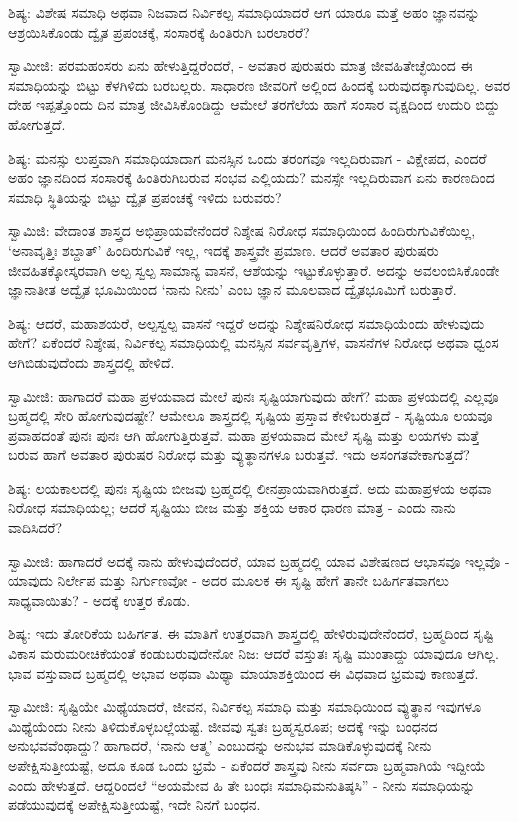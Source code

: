 ಶಿಷ್ಯ: ವಿಶೇಷ ಸಮಾಧಿ ಅಥವಾ ನಿಜವಾದ ನಿರ್ವಿಕಲ್ಪ ಸಮಾಧಿಯಾದರೆ ಆಗ ಯಾರೂ ಮತ್ತೆ ಅಹಂ ಜ್ಞಾನವನ್ನು ಆಶ್ರಯಿಸಿಕೊಂಡು ದ್ವೈತ ಪ್ರಪಂಚಕ್ಕೆ, ಸಂಸಾರಕ್ಕೆ ಹಿಂತಿರುಗಿ ಬರಲಾರರೆ?

ಸ್ವಾಮೀಜಿ: ಪರಮಹಂಸರು ಏನು ಹೇಳುತ್ತಿದ್ದರೆಂದರೆ, - ಅವತಾರ ಪುರುಷರು ಮಾತ್ರ ಜೀವಹಿತೇಚ್ಛೆಯಿಂದ ಈ ಸಮಾಧಿಯನ್ನು ಬಿಟ್ಟು ಕೆಳಗಿಳಿದು ಬರಬಲ್ಲರು. ಸಾಧಾರಣ ಜೀವರಿಗೆ ಅಲ್ಲಿಂದ ಹಿಂದಕ್ಕೆ ಬರುವುದಕ್ಕಾಗುವುದಿಲ್ಲ. ಅವರ ದೇಹ ಇಪ್ಪತ್ತೊಂದು ದಿನ ಮಾತ್ರ ಜೀವಿಸಿಕೊಂಡಿದ್ದು ಆಮೇಲೆ ತರಗೆಲೆಯ ಹಾಗೆ ಸಂಸಾರ ವೃಕ್ಷದಿಂದ ಉದುರಿ ಬಿದ್ದು ಹೋಗುತ್ತದೆ.

ಶಿಷ್ಯ: ಮನಸ್ಸು ಲುಪ್ತವಾಗಿ ಸಮಾಧಿಯಾದಾಗ ಮನಸ್ಸಿನ ಒಂದು ತರಂಗವೂ ಇಲ್ಲದಿರುವಾಗ - ವಿಕ್ಷೇಪದ, ಎಂದರೆ ಅಹಂ ಜ್ಞಾನದಿಂದ ಸಂಸಾರಕ್ಕೆ ಹಿಂತಿರುಗಿಬರುವ ಸಂಭವ ಎಲ್ಲಿಯದು? ಮನಸ್ಸೇ ಇಲ್ಲದಿರುವಾಗ ಏನು ಕಾರಣದಿಂದ ಸಮಾಧಿ ಸ್ಥಿತಿಯನ್ನು ಬಿಟ್ಟು ದ್ವೈತ ಪ್ರಪಂಚಕ್ಕೆ ಇಳಿದು ಬರುವರು?

ಸ್ವಾಮಿಜಿ: ವೇದಾಂತ ಶಾಸ್ತ್ರದ ಅಭಿಪ್ರಾಯವೇನೆಂದರೆ ನಿಶ್ಶೇಷ ನಿರೋಧ ಸಮಾಧಿಯಿಂದ ಹಿಂದಿರುಗುವಿಕೆಯಿಲ್ಲ, ‘ಅನಾವೃತ್ತಿಃ ಶಬ್ದಾತ್’ ಹಿಂದಿರುಗುವಿಕೆ ಇಲ್ಲ, ಇದಕ್ಕೆ ಶಾಸ್ತ್ರವೇ ಪ್ರಮಾಣ. ಆದರೆ ಅವತಾರ ಪುರುಷರು ಜೀವಹಿತಕ್ಕೋಸ್ಕರವಾಗಿ ಅಲ್ಪ ಸ್ವಲ್ಪ ಸಾಮಾನ್ಯ ವಾಸನೆ, ಆಶೆಯನ್ನು ಇಟ್ಟುಕೊಳ್ಳುತ್ತಾರೆ. ಅದನ್ನು ಅವಲಂಬಿಸಿಕೊಂಡೇ ಜ್ಞಾನಾತೀತ ಅದ್ವೈತ ಭೂಮಿಯಿಂದ ‘ನಾನು ನೀನು’ ಎಂಬ ಜ್ಞಾನ ಮೂಲವಾದ ದ್ವೈತಭೂಮಿಗೆ ಬರುತ್ತಾರೆ.

ಶಿಷ್ಯ: ಆದರೆ, ಮಹಾಶಯರೆ, ಅಲ್ಪಸ್ವಲ್ಪ ವಾಸನೆ ಇದ್ದರೆ ಅದನ್ನು ನಿಶ್ಶೇಷನಿರೋಧ ಸಮಾಧಿಯೆಂದು ಹೇಳುವುದು ಹೇಗೆ? ಏಕೆಂದರೆ ನಿಶ್ಶೇಷ, ನಿರ್ವಿಕಲ್ಪ ಸಮಾಧಿಯಲ್ಲಿ ಮನಸ್ಸಿನ ಸರ್ವವೃತ್ತಿಗಳ, ವಾಸನೆಗಳ ನಿರೋಧ ಅಥವಾ ಧ್ವಂಸ ಆಗಿಬಿಡುವುದೆಂದು ಶಾಸ್ತ್ರದಲ್ಲಿ ಹೇಳಿದೆ.

ಸ್ವಾಮೀಜಿ: ಹಾಗಾದರೆ ಮಹಾ ಪ್ರಳಯವಾದ ಮೇಲೆ ಪುನಃ ಸೃಷ್ಟಿಯಾಗುವುದು ಹೇಗೆ? ಮಹಾ ಪ್ರಳಯದಲ್ಲಿ ಎಲ್ಲವೂ ಬ್ರಹ್ಮದಲ್ಲಿ ಸೇರಿ ಹೋಗುವುದಷ್ಟೇ? ಆಮೇಲೂ ಶಾಸ್ತ್ರದಲ್ಲಿ ಸೃಷ್ಟಿಯ ಪ್ರಸ್ತಾವ ಕೇಳಿಬರುತ್ತದೆ - ಸೃಷ್ಟಿಯೂ ಲಯವೂ ಪ್ರವಾಹದಂತೆ ಪುನಃ ಪುನಃ ಆಗಿ ಹೋಗುತ್ತಿರುತ್ತವೆ. ಮಹಾ ಪ್ರಳಯವಾದ ಮೇಲೆ ಸೃಷ್ಟಿ ಮತ್ತು ಲಯಗಳು ಮತ್ತೆ ಬರುವ ಹಾಗೆ ಅವತಾರ ಪುರುಷರ ನಿರೋಧ ಮತ್ತು ವ್ಯುತ್ಥಾನಗಳೂ ಬರುತ್ತವೆ. ಇದು ಅಸಂಗತವೇಕಾಗುತ್ತದೆ?

ಶಿಷ್ಯ: ಲಯಕಾಲದಲ್ಲಿ ಪುನಃ ಸೃಷ್ಟಿಯ ಬೀಜವು ಬ್ರಹ್ಮದಲ್ಲಿ ಲೀನಪ್ರಾಯವಾಗಿರುತ್ತದೆ. ಅದು ಮಹಾಪ್ರಳಯ ಅಥವಾ ನಿರೋಧ ಸಮಾಧಿಯಲ್ಲ; ಆದರೆ ಸೃಷ್ಟಿಯು ಬೀಜ ಮತ್ತು ಶಕ್ತಿಯ ಆಕಾರ ಧಾರಣ ಮಾತ್ರ - ಎಂದು ನಾನು ವಾದಿಸಿದರೆ?

ಸ್ವಾಮೀಜಿ: ಹಾಗಾದರೆ ಅದಕ್ಕೆ ನಾನು ಹೇಳುವುದೆಂದರೆ, ಯಾವ ಬ್ರಹ್ಮದಲ್ಲಿ ಯಾವ ವಿಶೇಷಣದ ಆಭಾಸವೂ ಇಲ್ಲವೊ - ಯಾವುದು ನಿರ್ಲೇಪ ಮತ್ತು ನಿರ್ಗುಣವೋ - ಅದರ ಮೂಲಕ ಈ ಸೃಷ್ಟಿ ಹೇಗೆ ತಾನೇ ಬಹಿರ್ಗತವಾಗಲು ಸಾಧ್ಯವಾಯಿತು? - ಅದಕ್ಕೆ ಉತ್ತರ ಕೊಡು.

ಶಿಷ್ಯ: ಇದು ತೋರಿಕೆಯ ಬಹಿರ್ಗತ. ಈ ಮಾತಿಗೆ ಉತ್ತರವಾಗಿ ಶಾಸ್ತ್ರದಲ್ಲಿ ಹೇಳಿರುವುದೇನೆಂದರೆ, ಬ್ರಹ್ಮದಿಂದ ಸೃಷ್ಟಿ ವಿಕಾಸ ಮರುಮರೀಚಿಕೆಯಂತೆ ಕಂಡುಬರುವುದೇನೋ ನಿಜ: ಆದರೆ ವಸ್ತುತಃ ಸೃಷ್ಟಿ ಮುಂತಾದ್ದು ಯಾವುದೂ ಆಗಿಲ್ಲ. ಭಾವ ವಸ್ತುವಾದ ಬ್ರಹ್ಮದಲ್ಲಿ ಅಭಾವ ಅಥವಾ ಮಿಥ್ಯಾ ಮಾಯಾಶಕ್ತಿಯಿಂದ ಈ ವಿಧವಾದ ಭ್ರಮವು ಕಾಣುತ್ತದೆ.

ಸ್ವಾಮೀಜಿ: ಸೃಷ್ಟಿಯೇ ಮಿಥ್ಯೆಯಾದರೆ, ಜೀವನ, ನಿರ್ವಿಕಲ್ಪ ಸಮಾಧಿ ಮತ್ತು ಸಮಾಧಿಯಿಂದ ವ್ಯುತ್ಥಾನ ಇವುಗಳೂ ಮಿಥ್ಯೆಯೆಂದು ನೀನು ತಿಳಿದುಕೊಳ್ಳಬಲ್ಲೆಯಷ್ಟೆ. ಜೀವವು ಸ್ವತಃ ಬ್ರಹ್ಮಸ್ವರೂಪ; ಅದಕ್ಕೆ ಇನ್ನು ಬಂಧನದ ಅನುಭವವೆಂಥಾದ್ದು? ಹಾಗಾದರೆ, ‘ನಾನು ಆತ್ಮ’ ಎಂಬುದನ್ನು ಅನುಭವ ಮಾಡಿಕೊಳ್ಳುವುದಕ್ಕೆ ನೀನು ಅಪೇಕ್ಷಿಸುತ್ತೀಯಷ್ಟೆ, ಅದೂ ಕೂಡ ಒಂದು ಭ್ರಮೆ - ಏಕೆಂದರೆ ಶಾಸ್ತ್ರವು ನೀನು ಸರ್ವದಾ ಬ್ರಹ್ಮವಾಗಿಯೆ ಇದ್ದೀಯೆ ಎಂದು ಹೇಳುತ್ತದೆ. ಆದ್ದರಿಂದಲೆ “ಅಯಮೇವ ಹಿ ತೇ ಬಂಧಃ ಸಮಾಧಿಮನುತಿಷ್ಠಸಿ” - ನೀನು ಸಮಾಧಿಯನ್ನು ಪಡೆಯುವುದಕ್ಕೆ ಅಪೇಕ್ಷಿಸುತ್ತೀಯಷ್ಟೆ, ಇದೇ ನಿನಗೆ ಬಂಧನ.

